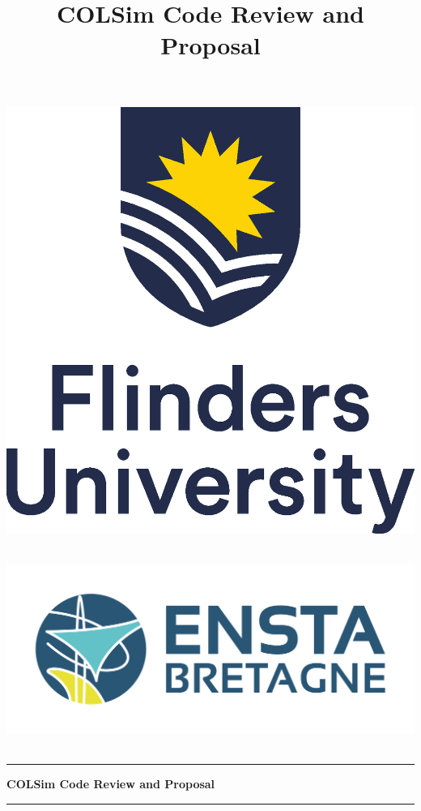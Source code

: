 \documentclass[12pt,oneside,a4paper,english]{article}
\title{COLSim Code Review and Proposal} %
\begin{document}
\hypersetup{hidelinks} %

\begin{titlepage}
    \begin{center}
    \vspace{1cm}
    \begin{minipage}[c]{0.6\linewidth}
        \centering
        \includegraphics[width=0.6\linewidth]{root/Flinders_University_Logo_Stacked_RGB_Master.eps}~\\[1cm]
    \end{minipage}\vspace{0.5cm}
    \begin{minipage}[c]{0.6\linewidth}
        \centering
        \includegraphics[width=0.9\linewidth]{root/ENSTA-LogoH-COULEUR.png}~\\[1cm]
    \end{minipage}
    \vspace{1cm}
    
    \hrule
    \vspace{.5cm}
    {\huge \bfseries COLSim Code Review and Proposal} %
    \vspace{.5cm}
    \hrule


\end{center}
\end{titlepage}
\end{document}
